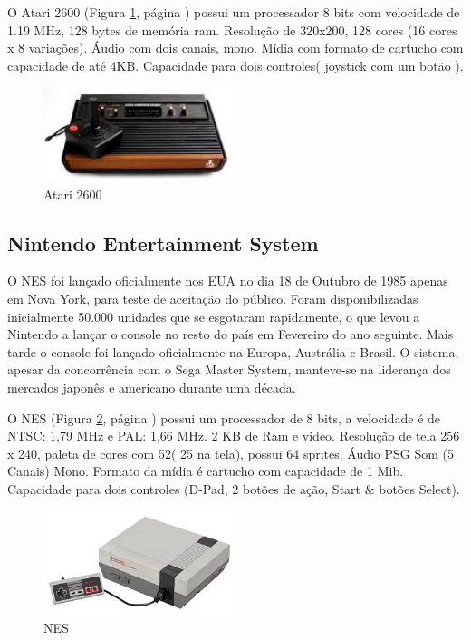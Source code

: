 \documentclass[12pt]{article}
\begin{document}
O Atari 2600 (Figura \ref{fig:atari}, página \pageref{fig:atari}) possui um processador 8 bits com velocidade de 1.19 MHz, 128 bytes de memória ram. Resolução de 320x200, 128 cores (16 cores x 8 variações). Áudio com dois canais, mono. Mídia com formato de cartucho com capacidade de até 4KB. Capacidade para dois controles( joystick com um botão ).

 \begin{figure}[!htb]
    \centering
    \includegraphics[width=0.5\textwidth]{atari.jpg}
    \caption{Atari 2600}
    \label{fig:atari}
\end{figure}

\subsection{Nintendo Entertainment System}
O NES foi lançado oficialmente nos EUA no dia 18 de Outubro de 1985 apenas em Nova York, para teste de aceitação do público. Foram disponibilizadas inicialmente 50.000 unidades que se esgotaram rapidamente, o que levou a Nintendo a lançar o console no resto do país em Fevereiro do ano seguinte. Mais tarde o console foi lançado oficialmente na Europa, Austrália e Brasil. O sistema, apesar da concorrência com o Sega Master System, manteve-se na liderança dos mercados japonês e americano durante uma década.

O NES (Figura \ref{fig:nes}, página \pageref{fig:nes}) possui um processador de 8 bits, a velocidade é de NTSC: 1,79 MHz e PAL: 1,66 MHz. 2 KB de Ram e video. Resolução de tela 256 x 240, paleta de cores com 52( 25 na tela), possui 64 sprites. Áudio PSG Som (5 Canais) Mono. Formato da mídia é cartucho com capacidade de 1 Mib. Capacidade para dois controles (D-Pad, 2 botões de ação, Start \& botões Select). 

 \begin{figure}[!htb]
    \centering
    \includegraphics[width=0.5\textwidth]{nes.jpg}
    \caption{NES}
    \label{fig:nes}
\end{figure} 
\end{document}
